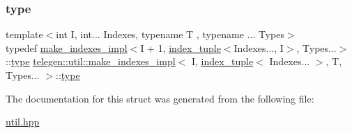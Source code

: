 \subsubsection{\texorpdfstring{type}{type}}
{\footnotesize\ttfamily template$<$int I, int... Indexes, typename T , typename ... Types$>$ \\
typedef \hyperlink{structtelegen_1_1util_1_1make__indexes__impl}{make\+\_\+indexes\+\_\+impl}$<$I + 1, \hyperlink{structtelegen_1_1util_1_1index__tuple}{index\+\_\+tuple}$<$Indexes..., I$>$, Types...$>$\+::\hyperlink{structtelegen_1_1util_1_1make__indexes__impl_3_01I_00_01index__tuple_3_01Indexes_8_8_8_01_4_00_01T_00_01Types_8_8_8_01_4_a5046a04e998e0bd21d60e07ed6ad6b0e}{type} \hyperlink{structtelegen_1_1util_1_1make__indexes__impl}{telegen\+::util\+::make\+\_\+indexes\+\_\+impl}$<$ I, \hyperlink{structtelegen_1_1util_1_1index__tuple}{index\+\_\+tuple}$<$ Indexes... $>$, T, Types... $>$\+::\hyperlink{structtelegen_1_1util_1_1make__indexes__impl_3_01I_00_01index__tuple_3_01Indexes_8_8_8_01_4_00_01T_00_01Types_8_8_8_01_4_a5046a04e998e0bd21d60e07ed6ad6b0e}{type}}



The documentation for this struct was generated from the following file\+:\begin{DoxyCompactItemize}
\item 
\hyperlink{util_8hpp}{util.\+hpp}\end{DoxyCompactItemize}
